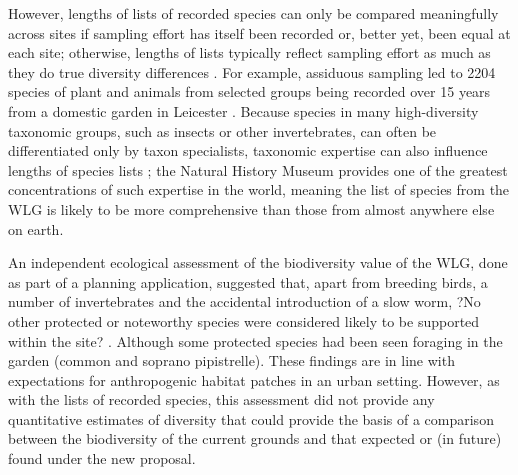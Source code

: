 However, lengths of lists of recorded species can only be compared meaningfully across sites if sampling effort has itself been recorded or, better yet, been equal at each site; otherwise, lengths of lists typically reflect sampling effort as much as they do true diversity differences \citep{Gotelli:2001el; Crawley:2005flora}. For example, assiduous sampling led to 2204 species of plant and animals from selected groups being recorded over 15 years from a domestic garden in Leicester \citep{Owen:1991ecology}. Because species in many high-diversity taxonomic groups, such as insects or other invertebrates, can often be differentiated only by taxon specialists, taxonomic expertise can also influence lengths of species lists \citep{Crawley:2005flora}; the Natural History Museum provides one of the greatest concentrations of such expertise in the world, meaning the list of species from the WLG is likely to be more comprehensive than those from almost anywhere else on earth.

An independent ecological assessment of the biodiversity value of the WLG, done as part of a planning application, suggested that, apart from breeding birds, a number of invertebrates and the accidental introduction of a slow worm, ?No other protected or noteworthy species were considered likely to be supported within the site? \citep{PrelimEcoAppraisal:2015cf, ImpactAssessment:2015cf}. Although some protected species had been seen foraging in the garden (common and soprano pipistrelle). These findings are in line with expectations for anthropogenic habitat patches in an urban setting. However, as with the lists of recorded species, this assessment did not provide any quantitative estimates of diversity that could provide the basis of a comparison between the biodiversity of the current grounds and that expected or (in future) found under the new proposal.

